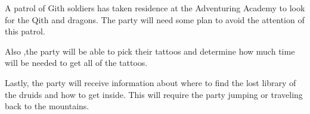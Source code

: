 A patrol of Gith soldiers has taken residence at the Adventuring Academy to look for the Qith and dragons.
The party will need some plan to avoid the attention of this patrol.

Also ,the party will be able to pick their tattoos and determine how much time will be needed to get all of the tattoos.

Lastly, the party will receive information about where to find the lost library of the druids and how to get inside.
This will require the party jumping or traveling back to the mountains.
